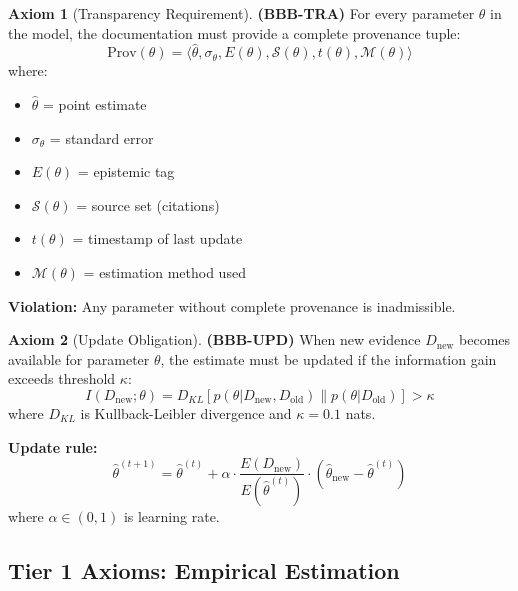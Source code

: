 \documentclass[11pt,a4paper]{article}
\theoremstyle{definition}
\newtheorem{axiom}{Axiom}[section]
\begin{document}
\begin{axiom}[Transparency Requirement]
\label{ax:bbb-tra}
\textbf{(BBB-TRA)} For every parameter $\theta$ in the model, the documentation 
must provide a complete provenance tuple:
\begin{equation}
\text{Prov}(\theta) = \langle \hat{\theta}, \sigma_\theta, E(\theta), \mathcal{S}(\theta), t(\theta), \mathcal{M}(\theta) \rangle
\end{equation}
where:
\begin{itemize}
    \item $\hat{\theta}$ = point estimate
    \item $\sigma_\theta$ = standard error
    \item $E(\theta)$ = epistemic tag
    \item $\mathcal{S}(\theta)$ = source set (citations)
    \item $t(\theta)$ = timestamp of last update
    \item $\mathcal{M}(\theta)$ = estimation method used
\end{itemize}
\textbf{Violation:} Any parameter without complete provenance is inadmissible.
\end{axiom}

\begin{axiom}[Update Obligation]
\label{ax:bbb-upd}
\textbf{(BBB-UPD)} When new evidence $D_{\text{new}}$ becomes available for 
parameter $\theta$, the estimate must be updated if the information gain exceeds 
threshold $\kappa$:
\begin{equation}
I(D_{\text{new}}; \theta) = D_{KL}\left[ p(\theta | D_{\text{new}}, D_{\text{old}}) \| p(\theta | D_{\text{old}}) \right] > \kappa
\end{equation}
where $D_{KL}$ is Kullback-Leibler divergence and $\kappa = 0.1$ nats.

\textbf{Update rule:}
\begin{equation}
\hat{\theta}^{(t+1)} = \hat{\theta}^{(t)} + \alpha \cdot \frac{E(D_{\text{new}})}{E(\hat{\theta}^{(t)})} \cdot (\hat{\theta}_{\text{new}} - \hat{\theta}^{(t)})
\end{equation}
where $\alpha \in (0,1)$ is learning rate.
\end{axiom}

\subsection{Tier 1 Axioms: Empirical Estimation}
\end{document}
